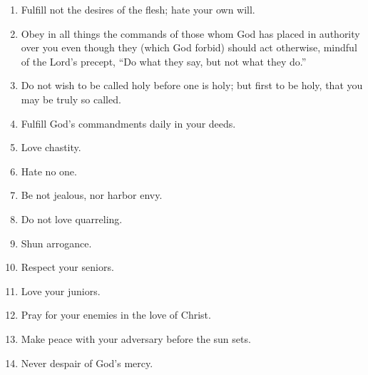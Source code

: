 \documentclass[12pt,letterpaper]{article}
\newcommand{\code}{\item}
\begin{document}
\begin{enumerate}[leftmargin=1.75em,itemsep=0.25ex]
\code Fulfill not the desires of the flesh; hate your own will.
\code Obey in all things the commands of those whom God has placed in authority over you even though they (which God forbid) should act otherwise, mindful of the Lord's precept, ``Do what they say, but not what they do.''
\code Do not wish to be called holy before one is holy; but first to be holy, that you may be truly so called.
\code Fulfill God's commandments daily in your deeds.
\code Love chastity.
\code Hate no one.
\code Be not jealous, nor harbor envy.
\code Do not love quarreling.
\code Shun arrogance.
\code Respect your seniors.
\code Love your juniors.
\code Pray for your enemies in the love of Christ.
\code Make peace with your adversary before the sun sets.
\code Never despair of God's mercy.
\end{enumerate}
\end{document}
